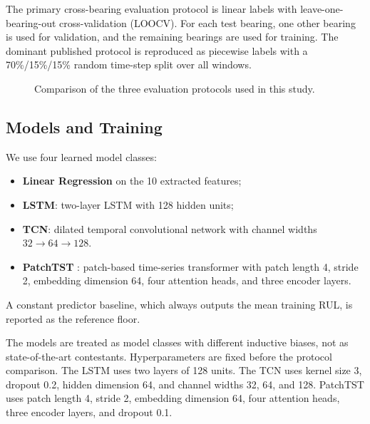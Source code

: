 \documentclass[5p,twocolumn]{elsarticle}
\begin{document}
The primary cross-bearing evaluation protocol is linear labels with leave-one-bearing-out cross-validation (LOOCV). For each test bearing, one other bearing is used for validation, and the remaining bearings are used for training. The dominant published protocol is reproduced as piecewise labels with a 70\%/15\%/15\% random time-step split over all windows.

\begin{figure}[t]
\centering
{}
\caption{Comparison of the three evaluation protocols used in this study.}
\label{fig:protocols}
\end{figure}

\subsection{Models and Training}
We use four learned model classes:
\begin{itemize}
    \item \textbf{Linear Regression} on the 10 extracted features;
    \item \textbf{LSTM}: two-layer LSTM with 128 hidden units;
    \item \textbf{TCN}: dilated temporal convolutional network with channel widths $32 \to 64 \to 128$.
    \item \textbf{PatchTST} \cite{patchtst2023}: patch-based time-series transformer with patch length 4, stride 2, embedding dimension 64, four attention heads, and three encoder layers.
\end{itemize}
A constant predictor baseline, which always outputs the mean training RUL, is reported as the reference floor.

The models are treated as model classes with different inductive biases, not as state-of-the-art contestants. Hyperparameters are fixed before the protocol comparison. The LSTM uses two layers of 128 units. The TCN uses kernel size 3, dropout 0.2, hidden dimension 64, and channel widths 32, 64, and 128. PatchTST uses patch length 4, stride 2, embedding dimension 64, four attention heads, three encoder layers, and dropout 0.1.
\end{document}
